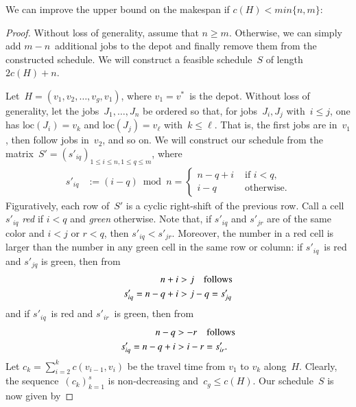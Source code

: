 \documentclass[natbib,sort,smallextended,envcountsame,envcountsect,numbook]{svjour3}
\newcommand{\HC}{H}
\newcommand{\bigO}{O}
\newcommand{\ROSUPT}{\textsc{ROS-UET}}
\newcommand{\loc}{\text{loc}}
\newcommand{\njobs}{n}
\newcommand{\nmach}{m}
\newcommand{\nverts}{g}
\begin{document}
\noindent
We can improve the upper bound
on the makespan
if \(c(H)<min\{\njobs,\nmach\}\):
\begin{proof}
  Without loss of generality, assume that \(n\geq m\).  Otherwise, we
  can simply add
  $m-n$~additional jobs to the depot and finally remove them from the
  constructed schedule.  We will construct a feasible schedule~\(S\)
  of length~\(2c(\HC)+n\).

  Let~\(\HC=(v_1,v_2,\ldots, v_{\nverts},v_1)\),
  where \(v_1=v^* \)~is the depot.
  Without loss of generality,
  let the jobs~\(J_1,\dots,J_n\) be ordered so that,
  for jobs~\(J_i,J_j\) with~\(i\leq j\), one has \(\loc(J_i)=v_k\)
  and \(\loc(J_j)=v_\ell\) with~\(k\leq\ell\).
  That is, the first jobs are in~\(v_1\),
  then follow jobs in~\(v_2\), and so on.  
  We will construct our schedule from the
  matrix~\(S'=(s'_{iq})_{1\leq i\leq n,1\leq q\leq m}\), where
  \begin{align}
s'_{iq}&:=(i-q)\bmod n=
\begin{cases}
  n-q+i&\text{ if \(i< q\),}\\
  i-q&\text{ otherwise.}
\end{cases}\label{eq:shift}
  \end{align}
  Figuratively, each row of~\(S'\) is a cyclic right-shift of the previous row.
Call a cell $s'_{iq}$ \textit{red} if $i<q$ and \textit{green} otherwise. Note that, if $s'_{iq}$ and $s'_{jr}$ are of the same color and $i<j$ or $r<q$, then $s'_{iq}<s'_{jr}$. Moreover, the number in a red cell is larger than the number in any green cell in the same row or column: if \(s'_{iq}\)~is red and \(s'_{jq}\) is green, then from
 \begin{align*}
   n+i&>j\text{\quad follows}\\
   s'_{iq}=n-q+i&>j-q=s'_{jq}
 \end{align*}
and if \(s'_{iq}\)~is red and \(s'_{ir}\)~is green, then from
\begin{align*}
  n-q&>-r\text{\quad follows}\\
s'_{iq}=n-q+i&>i-r=s'_{ir}.
\end{align*}
Let $c_k=\sum_{i=2}^{k}c(v_{i-1},v_i)$ be the travel time from $v_1$ to $v_k$ along~\(\HC\).  Clearly, the sequence~$(c_k)_{k=1}^s$ is non-decreasing and~$c_{\nverts}\leq c(\HC)$.  Our schedule~\(S\) is now given by

\end{proof}
\end{document}
